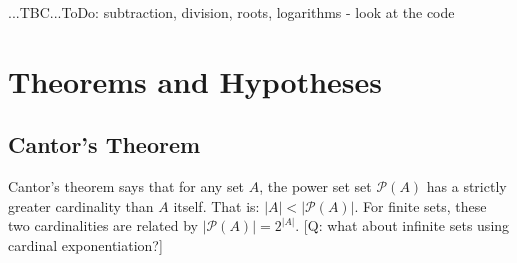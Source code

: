 ...TBC...ToDo: subtraction, division, roots, logarithms - look at the code










\section{Theorems and Hypotheses}

\subsection{Cantor's Theorem}
Cantor's theorem says that for any set $A$, the power set set $\mathcal{P}(A)$ has a strictly greater cardinality than $A$ itself. That is: $|A| < |\mathcal{P}(A)|$. For finite sets, these two cardinalities are related by $|\mathcal{P}(A)| = 2^{|A|}$. [Q: what about infinite sets using cardinal exponentiation?]



